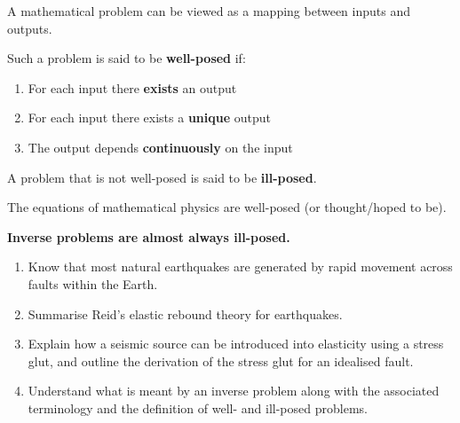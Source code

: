 \documentclass[14pt]{beamer}
\begin{document}
\begin{frame}
A mathematical problem can be viewed as a mapping between inputs and outputs.

Such a problem is said to be \textbf{well-posed} if:
\begin{enumerate}
\item For each input there \textbf{exists} an output
\item For each input there exists a \textbf{unique} output
\item The output depends \textbf{continuously} on the input
\end{enumerate}
A problem that is not well-posed is said to be \textbf{ill-posed}.

The equations of mathematical physics are well-posed (or thought/hoped to be).

\textbf{Inverse problems are almost always ill-posed.}
\end{frame}

\begin{frame}[t]
\begin{enumerate}
\item[(i)] Know that most natural earthquakes are generated by rapid movement across faults within the Earth.
\item[(ii)] Summarise Reid's elastic rebound theory for earthquakes.
\item[(iii)] Explain how a seismic source can be introduced into elasticity using a stress glut, and outline the
derivation of the stress glut for an idealised fault.
\item[(iv)] Understand what is meant by an inverse problem along with the associated terminology and the definition of
well- and ill-posed problems.
\end{enumerate}
\end{frame}
\end{document}
